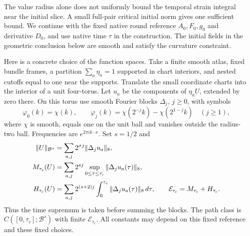 \documentclass[11pt]{article}
\numberwithin{equation}{section}
\theoremstyle{definition}
\theoremstyle{remark}
\begin{document}
The value radius alone does not uniformly bound the
temporal strain integral near the initial slice. A small
full-pair critical initial norm gives one sufficient bound. We continue with the fixed native round
reference $A_0,F_0,g_0$ and derivative $D_0$, and use native
time $\tau$ in the construction. The initial fields in the
geometric conclusion below are smooth and satisfy the
curvature constraint.

Here is a concrete choice of the function spaces.
Take a finite smooth atlas, fixed bundle frames, a partition
$\sum_a\eta_a=1$ supported in chart interiors, and nested
cutoffs equal to one near the supports. Translate the small
coordinate charts into the interior of a unit four-torus.
Let $u_a$ be the components of $\eta_aU$, extended by zero
there. On this torus use smooth Fourier blocks $\Delta_j$,
$j\ge0$, with symbols
\[
 \varphi_0(k)=\chi(k),\qquad
 \varphi_j(k)=\chi(2^{-j}k)-\chi(2^{1-j}k)\quad(j\ge1),
\]
where $\chi$ is smooth, equals one on the unit ball and
vanishes outside the radius-two ball. Frequencies are
$e^{2\pi i k\cdot x}$. Set $s=1/2$ and
\begin{align}
 \|U\|_{\mathcal B^\sigma}
   &=\sum_{a,j}2^{\sigma j}\|\Delta_j u_a\|_8,\notag\\
 M_{\tau_c}(U)
   &=\sum_{a,j}2^{sj}\sup_{0\le\tau\le\tau_c}
                                  \|\Delta_j u_a(\tau)\|_8,\notag\\
 H_{\tau_c}(U)
   &=\sum_{a,j}2^{(s+2)j}\int_0^{\tau_c}
                                  \|\Delta_j u_a(\tau)\|_8\,d\tau,
 \qquad \mathcal E_{\tau_c}=M_{\tau_c}+H_{\tau_c}.
 \label{eq:critical-norm}
\end{align}
Thus the time supremum is taken before summing the blocks.
The path class is $C([0,\tau_c];\mathcal B^s)$ with finite
$\mathcal E_{\tau_c}$. All constants may depend on this
fixed reference and these fixed choices.
\end{document}
